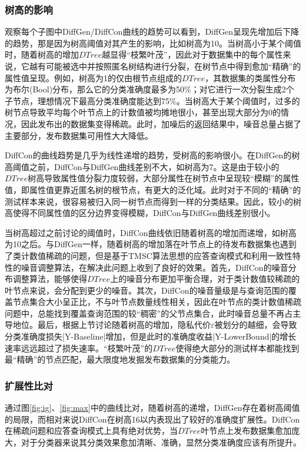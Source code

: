 \subsubsection{树高的影响} 
观察每个子图中DiffGen/DiffCon曲线的趋势可以看到，DiffGen呈现先增加后下降的趋势，那是因为树高阈值对其产生的影响，比如树高为10。当树高小于某个阈值时，随着树高的增加$DTree$越显得“枝繁叶茂”，因此对于数据集中的每个属性来说，它越有可能被选中并按照匿名树结构进行分裂，在树节点中得到愈加“精确”的属性值呈现。例如，树高为1的仅由根节点组成的$DTree$，其数据集的类属性分布为布尔(Bool)分布，那么它的分类准确度最多为50\%；对它进行一次分裂生成2个子节点，理想情况下最高分类准确度能达到75\%。当树高大于某个阈值时，过多的树节点导致平均每个叶节点上的计数值被均摊地很小，甚至出现大部分为0的情况，因此发布出的数据集变得稀疏\supercite{sparse_data_summary}。此时，加噪后的返回结果中，噪音总量占据了主要部分，发布数据集可用性大大降低。

DiffCon的曲线趋势是几乎为线性递增的趋势，受树高的影响很小。在DiffGen的树高阈值之前，DiffCon与DiffGen曲线差别不大，如树高为7。这是由于较小的$DTree$树高导致属性值分裂力度较弱，大部分属性在树节点中呈现较“模糊”的属性值，即属性值更靠近匿名树的根节点，有更大的泛化域。此时对于不同的“精确”的测试样本来说，很容易被归入同一树节点而得到一样的分类结果。因此，较小的树高使得不同属性值的区分边界变得模糊，DiffCon与DiffGen曲线差别很小。

当树高超过之前讨论的阈值时，DiffCon曲线依旧随着树高的增加而递增，如树高为10之后。与DiffGen一样，随着树高的增加落在叶节点上的待发布数据集也遇到了类计数值稀疏的问题，但是基于TMSC算法思想的应答查询模式和利用一致性特性的噪音调整算法，在解决此问题上收到了良好的效果。首先，DiffCon的噪音分布调整算法，能够使得$DTree$上的噪音分布更加平衡合理，对于类计数值较稀疏的叶节点来说，会分配到更少的噪音。其次，DiffCon的噪音量级是与查询范围的覆盖节点集合大小呈正比，不与叶节点数量线性相关，因此在叶节点的类计数值稀疏问题中，总能找到覆盖查询范围的较“稠密”的父节点集合，此时噪音总量不再占主导地位。最后，根据上节讨论随着树高的增加，隐私代价$\varepsilon$被划分的越细，会导致分类准确度损失|Y-Baseline|增加，但是此时的准确度收益|Y-LowerBound|的增长速率远远超过了损失速率。“枝繁叶茂”的$DTree$使得绝大部分的测试样本都能找到最“精确”的节点匹配，最大限度地发掘发布数据集的分类能力。

\subsubsection{扩展性比对}
通过图\ref{fig:ig}、\ref{fig:max}中的曲线比对，随着树高的递增，DiffGen存在着树高阈值的局限，而相对来说DiffCon在树高16以内表现出了较好的准确度扩展性。DiffCon在稀疏问题和应答查询模式上具有绝对优势，当$DTree$叶节点上发布数据集愈加庞大，对于分类器来说其分类效果愈加清晰、准确，显然分类准确度应该有所提升。

